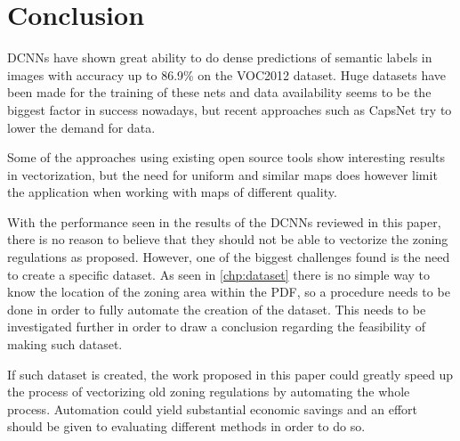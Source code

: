 \chapter{Conclusion}
DCNNs have shown great ability to do dense predictions of semantic labels in images with accuracy up to 86.9\% on the VOC2012 dataset. Huge datasets have been made for the training of these nets and data availability seems to be the biggest factor in success nowadays, but recent approaches such as CapsNet \cite{Sabour2017} try to lower the demand for data.

Some of the approaches using existing open source tools show interesting results in vectorization, but the need for uniform and similar maps does however limit the application when working with maps of different quality.

With the performance seen in the results of the DCNNs reviewed in this paper, there is no reason to believe that they should not be able to vectorize the zoning regulations as proposed. However, one of the biggest challenges found is the need to create a specific dataset. As seen in \autoref{chp:dataset} there is no simple way to know the location of the zoning area within the PDF, so a procedure needs to be done in order to fully automate the creation of the dataset. This needs to be investigated further in order to draw a conclusion regarding the feasibility of making such dataset.

If such dataset is created, the work proposed in this paper could greatly speed up the process of vectorizing old zoning regulations by automating the whole process. Automation could yield substantial economic savings and an effort should be given to evaluating different methods in order to do so.